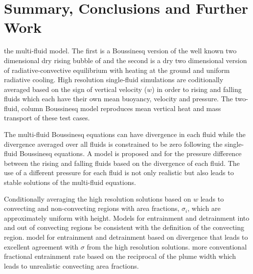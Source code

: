 \documentclass[draft]{agujournal2019}
\begin{document}
\section{Summary, Conclusions and Further Work \label{sec:concs}}

\change[HW}{This paper presents solutions of the multi-fluid Boussinesq equations for convection, reproducing aspects of highly resolved dry convection
at coarse horizontal resolution.}
{This paper presents solutions of the two-fluid Boussinesq equations using coarse horizontal resolution (one column) which reproduce aspects of highly resolved single-fluid simulations of dry, two-dimensional convection.}
Two test cases are used to \change[HW]{validate}{evaluate}
the multi-fluid model. The first is a Boussinesq version of the well
known two dimensional dry rising bubble of  and the second
is a dry two dimensional version of radiative-convective equilibrium
with heating at the ground and uniform radiative cooling. High resolution
single-fluid simulations are coditionally averaged based on the sign
of vertical velocity ($w$) in order to  rising and falling
fluids which each have their own mean buoyancy, velocity and pressure.
The two-fluid,  column Boussinesq model reproduces mean vertical
heat and mass transport of these test cases. 

The multi-fluid Boussinesq equations can have divergence in each fluid
while the divergence averaged over all fluids is 
{constrained to be zero following the single-fluid Boussinesq equations.}
A model is proposed and  for the pressure difference between the rising
and falling fluids based on the divergence of each fluid. The use
of a different pressure for each fluid is not only realistic but also
leads to stable solutions of the multi-fluid equations. 

Conditionally averaging the high resolution solutions based on $w$
leads to convecting and non-convecting regions with area fractions,
$\sigma_{i}$, which are approximately uniform with height. Models
for entrainment and detrainment into and out of convecting regions
 be consistent with the definition of the convecting region.
 model for entrainment and detrainment based on divergence 
that leads to excellent agreement with $\sigma$ from the high resolution
solutions.  more conventional fractional entrainment rate based on the reciprocal of the plume width  which leads to unrealistic convecting area fractions. 
\end{document}
